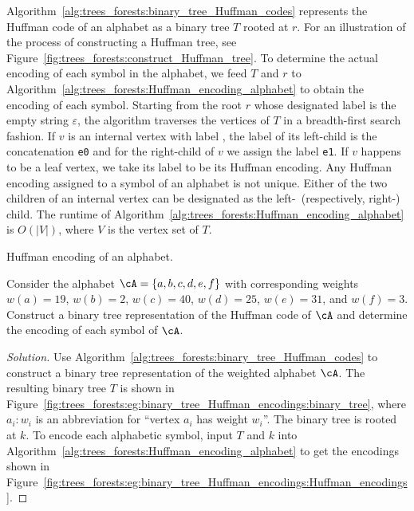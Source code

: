 Algorithm~\ref{alg:trees_forests:binary_tree_Huffman_codes} represents
the Huffman code of an alphabet as a
binary tree $T$ rooted at
$r$. For an illustration of the process of constructing a Huffman
tree, see Figure~\ref{fig:trees_forests:construct_Huffman_tree}. To
determine the actual encoding of each symbol in the alphabet, we feed
$T$ and $r$ to
Algorithm~\ref{alg:trees_forests:Huffman_encoding_alphabet} to obtain
the encoding of each symbol. Starting from the root $r$ whose
designated label is the empty string
$\varepsilon$\index{$\varepsilon$}, the algorithm traverses the
vertices of $T$ in a breadth-first search
fashion. If $v$ is an internal vertex with label \tte, the label of
its left-child is the concatenation \verb!e0! and
for the right-child of $v$ we assign the label
\verb!e1!. If $v$ happens to be a leaf vertex, we take its label to be
its Huffman encoding. Any Huffman encoding assigned to a symbol of an
alphabet is not unique. Either of the two children of an internal
vertex can be designated as the left-~(respectively, right-)
child. The runtime of
Algorithm~\ref{alg:trees_forests:Huffman_encoding_alphabet} is
$O(|V|)$, where $V$ is the vertex set of $T$.

\begin{algorithm}[!htbp]

\caption{Huffman encoding of an alphabet.}
\label{alg:trees_forests:Huffman_encoding_alphabet}
\end{algorithm}

\begin{example}
Consider the alphabet $\cA = \{a, b, c, d, e, f\}$ with corresponding
weights $w(a) = 19$, $w(b) = 2$, $w(c) = 40$, $w(d) = 25$,
$w(e) = 31$, and $w(f) = 3$. Construct a binary tree representation of
the Huffman code of $\cA$ and determine the encoding of each symbol of
$\cA$.
\end{example}

\begin{proof}[Solution]
Use Algorithm~\ref{alg:trees_forests:binary_tree_Huffman_codes} to
construct a binary tree representation of the weighted alphabet
$\cA$. The resulting binary tree $T$ is shown in
Figure~\ref{fig:trees_forests:eg:binary_tree_Huffman_encodings:binary_tree},
where $a_i: w_i$ is an abbreviation for
``vertex $a_i$ has weight $w_i$''. The binary tree is rooted at
$k$. To encode each alphabetic symbol, input $T$ and $k$ into
Algorithm~\ref{alg:trees_forests:Huffman_encoding_alphabet} to get the
encodings shown in
Figure~\ref{fig:trees_forests:eg:binary_tree_Huffman_encodings:Huffman_encodings}.
\end{proof}

